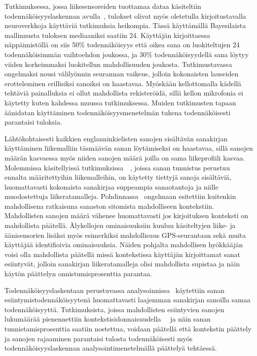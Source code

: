 \documentclass[finnish]{tktltiki2}
\theoremstyle{definition}
\theoremstyle{remark}
\begin{document}
Tutkimuksessa, jossa liikesensoreiden tuottamaa dataa käsiteltiin todennäköisyyslaskennan avulla~\cite{mole}, tulokset olivat myös oletetulla kirjoitustavalla neuroverkkoja käyttäviä tutkimuksia heikompia. Tässä käyttämällä Bayesilaista mallinnusta tuloksen mediaaniksi saatiin 24. Käyttäjän kirjoittaessa näppäimistöllä on siis 50\% todennäköisyys että oikea sana on luokiteltujen 24 todennäköisimmän vaihtoehdon joukossa, ja 30\% todennäköisyydellä sana löytyy viiden korkeimmaksi luokitellun mahdollisuuden joukosta. Tutkimustavassa ongelmaksi nousi välilyönnin seurannan vaikeus, jolloin kokonaisten lauseiden erotteleminen erillisiksi sanoiksi on haastavaa. Myöskään kellottomalla kädellä tehtäviä painalluksia ei ollut mahdollista rekisteröidä, sillä kellon mikrofonia ei käytetty kuten kahdessa muussa tutkimuksessa. Muiden tutkimusten tapaan äänidatan käyttäminen todennäköisyysmenetelmän tukena todennäköisesti parantaisi tuloksia.

Lähtökohtaisesti kaikkien englanninkielisten sanojen sisältävän sanakirjan käyttäminen liikemalliin täsmäävän sanan löytämiseksi on haastavaa, sillä sanojen määrän kasvaessa myös niiden sanojen määrä joilla on sama liikeprofiili kasvaa. Molemmissa käsitellyissä tutkimuksissa~\cite{maiti}~\cite{liu}, joissa sanan tunnistus perustuu ennalta määritettyihin liikemalleihin, on käytetty tiettyjä sanoja sisältäviä, huomattavasti kokonaista sanakirjaa suppeampia sanaotantoja ja niille muodostettuja liikeratamalleja. Pohdinnassa~\cite{liu} ongelmaan esitettiin kuitenkin mahdollisena ratkaisuna sanaston sitomista mahdolliseen kontekstiin. Mahdollisten sanojen määrä vähenee huomattavasti jos kirjoituksen konteksti on mahdollista päätellä. Älykellojen ominaisuuksiin kuuluu käsiteltyjen liike- ja äänisensorien lisäksi myös esimerkiksi mahdollisuus GPS-seurantaan sekä muita käyttäjää identifioivia ominaisuuksia. Näiden pohjalta mahdollisen hyökkääjän voisi olla mahdollista päätellä missä kontekstissa käyttäjän kirjoittamat sanat esiintyvät, jolloin sanakirjan liikeratamalleja olisi mahdollista supistaa ja näin käytön päättelyn onnistumisprosenttia parantaa. 

Todennäköisyyslaskentaan perustuvassa analysoinnissa~\cite{mole} käytettiin sanan esiintymistodennäköisyytenä huomattavasti laajemman sanakirjan sanoilla samaa todennäköisyyttä. Tutkimuksista, joissa mahdollisten esiintyvien sanojen lukumäärää pienennettiin kontekstisidonnaisuudella~\cite{liu}~\cite{mar} ja näin sanan tunnistamisprosenttia saatiin nostettua, voidaan päätellä että kontekstin päättely ja sanojen rajaaminen parantaisi tulosta todennäköisesti myös todennäköisyyslaskennan analysointimenetelmällä päättelyä tehtäessä. 
\end{document}
